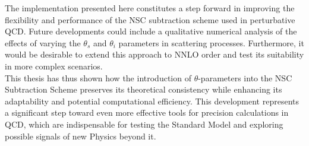 \documentclass[a4paper, 12pt]{book}
\begin{document}
The implementation presented here constitutes a step forward in improving the flexibility and performance of the NSC subtraction scheme used in perturbative QCD. Future developments could include a qualitative numerical analysis of the effects of varying the $\theta_s$ and $\theta_i$ parameters in scattering processes. Furthermore, it would be desirable to extend this approach to NNLO order and test its suitability in more complex scenarios.\\
This thesis has thus shown how the introduction of $\theta$-parameters into the NSC Subtraction Scheme preserves its theoretical consistency while enhancing its adaptability and potential computational efficiency. This development represents a significant step toward even more effective tools for precision calculations in QCD, which are indispensable for testing the Standard Model and exploring possible signals of new Physics beyond it.

\clearpage
\end{document}
